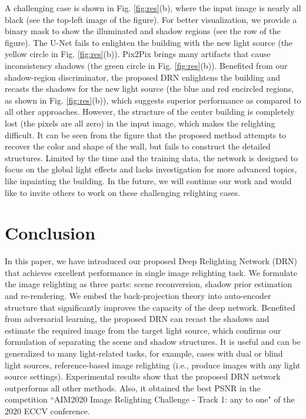 \documentclass[runningheads]{llncs}
\begin{document}
A challenging case is shown in Fig. \ref{fig:res}(b), where the input image is nearly all black (see the top-left image of the figure). For better visualization, we provide a binary mask to show the illuminated and shadow regions (see the  row of the figure).  The U-Net \cite{UNet} fails to enlighten the building with the new light source (the yellow circle in Fig. \ref{fig:res}(b)). Pix2Pix \cite{pix2pix} brings many artifacts that cause inconsistency shadows (the green circle in Fig. \ref{fig:res}(b)). Benefited from our shadow-region discriminator, the proposed DRN enlightens the building and recasts the shadows for the new light source (the blue and red encircled regions, as shown in Fig. \ref{fig:res}(b)), which suggests superior performance as compared to all other approaches. However, the structure of the center building is completely lost (the pixels are all zero) in the input image, which makes the relighting difficult. It can be seen from the figure that the proposed method attempts to recover the color and shape of the wall, but fails to construct the detailed structures. Limited by the time and the training data, the network is designed to focus on the global light effects and lacks investigation for more advanced topics, like inpainting the building. In the future, we will continue our work and would like to invite others to work on these challenging relighting cases.

\baselineskip 
\section{Conclusion}
\baselineskip 
In this paper, we have introduced our proposed Deep Relighting Network (DRN) that achieves excellent performance in single image relighting task. We formulate the image relighting as three parts: scene reconversion, shadow prior estimation and re-rendering. We embed the back-projection theory into auto-encoder structure that significantly improves the capacity of the deep network. Benefited from adversarial learning, the proposed DRN can recast the shadows and estimate the required image from the target light source, which confirms our formulation of separating the scene and shadow structures. It is useful and can be generalized to many light-related tasks, for example, cases with dual or blind light sources, reference-based image relighting (i.e., produce images with any light source settings).  Experimental results show that the proposed DRN network outperforms all other methods. Also, it obtained the best PSNR in the competition ``AIM2020 Image Relighting Challenge - Track 1: any to one" of the 2020 ECCV conference.

\clearpage


\end{document}
